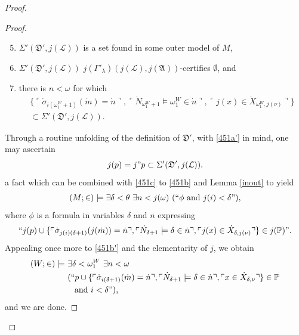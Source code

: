 \documentclass[12pt, twoside]{memoir}
\numberwithin{equation}{section}
\theoremstyle{definition}
\theoremstyle{remark}
\theoremstyle{definition}
\theoremstyle{definition}
\theoremstyle{definition}
\theoremstyle{remark}
\begin{document}
\begin{proof}
\begin{proof}
\begin{enumerate}[label=(\alph*)]
    \setcounter{enumi}{4}
    \item\label{451c} $\Sigma'(\mathfrak{D}', j(\mathcal{L}))$ is a set found in some outer model of $M$,
    \item\label{451a} $\Sigma'(\mathfrak{D}', j(\mathcal{L}))$ $j(\Gamma'_{\lambda}) (j(\mathcal{L}), j(\mathfrak{A}))$-certifies $\emptyset$, and
    \item\label{451b} there is $n < \omega$ for which 
    \begin{gather*}
        \{\ulcorner \dot{\sigma}_{i(\omega_1^W + 1)}(\dot{m}) = \dot{n} \urcorner, \ulcorner \dot{N}_{\omega_1^W + 1} \models \omega_1^W \in \dot{n} \urcorner, \ulcorner j(x) \in \dot{X}_{\omega_1^W, j(\nu)} \urcorner\} \\
        \subset \Sigma'(\mathfrak{D}', j(\mathcal{L})) \text{.}
    \end{gather*}
\end{enumerate}
Through a routine unfolding of the definition of $\mathfrak{D}'$, with \ref{451a'} in mind, one may ascertain 
\begin{equation*}
    j(p) = j" p \subset \Sigma'(\mathfrak{D}', j(\mathcal{L})) \text{.}
\end{equation*}
a fact which can be combined with \ref{451c} to \ref{451b} and Lemma \ref{inout} to yield
\begin{align*}
    (M; \in) \models \exists \delta < \theta \ \exists n < j(\omega) \ (``\phi \text{ and } j(i) < \delta") \text{,}
\end{align*}
where $\phi$ is a formula in variables $\delta$ and $n$ expressing
\begin{equation*}
    ``j(p) \cup \{\ulcorner \dot{\sigma}_{j(i)(\delta + 1)}(j(\dot{m})) = \dot{n} \urcorner, \ulcorner \dot{N}_{\delta + 1} \models \delta \in \dot{n} \urcorner, \ulcorner j(x) \in \dot{X}_{\delta, j(\nu)} \urcorner\} \in j(\mathbb{P})" \text{.}
\end{equation*}
Appealing once more to \ref{451b'} and the elementarity of $j$, we obtain
\begin{align*}
    (W; \in) \models \ & \exists \delta < \omega_1^W \ \exists n < \omega \\
    & (``p \cup \{\ulcorner \dot{\sigma}_{i(\delta + 1)}(\dot{m}) = \dot{n} \urcorner, \ulcorner \dot{N}_{\delta + 1} \models \delta \in \dot{n} \urcorner, \ulcorner x \in \dot{X}_{\delta, \nu} \urcorner\} \in \mathbb{P} \\
    & \mspace{15mu} \text{and } i < \delta") \text{,}
\end{align*}
and we are done.
\end{proof}


\end{proof}
\end{document}
